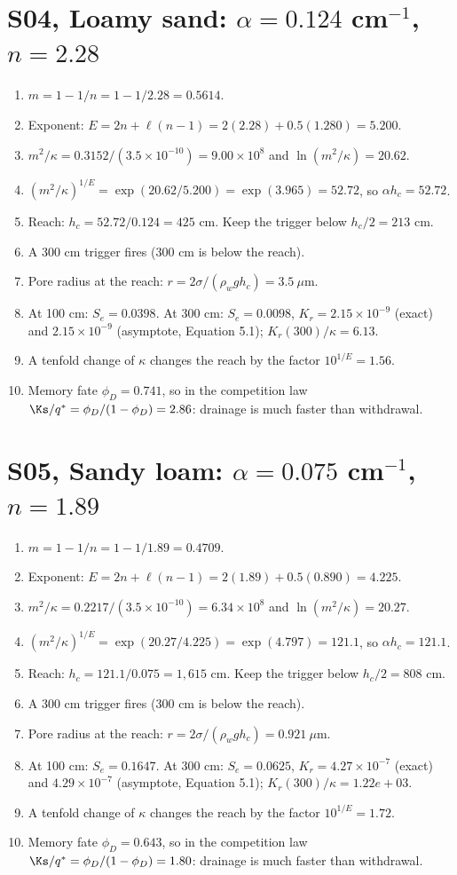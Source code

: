 \section{S04, Loamy sand: $\alpha=0.124$ cm$^{-1}$, $n=2.28$}
\begin{enumerate}[leftmargin=*,itemsep=1pt]
\item $m=1-1/n=1-1/2.28=0.5614$.
\item Exponent: $E=2n+\ell(n-1)=2(2.28)+0.5(1.280)=5.200$.
\item $m^2/\kappa=0.3152/(3.5\times10^{-10})=9.00\times10^{8}$ and $\ln(m^2/\kappa)=20.62$.
\item $(m^2/\kappa)^{1/E}=\exp(20.62/5.200)=\exp(3.965)=52.72$, so $\alpha h_c=52.72$.
\item Reach: $h_c=52.72/0.124=425$ cm. Keep the trigger below $h_c/2=213$ cm.
\item A 300 cm trigger fires (300 cm is below the reach).
\item Pore radius at the reach: $r=2\sigma/(\rho_wgh_c)=3.5\ \mu$m.
\item At 100 cm: $S_e=0.0398$. At 300 cm: $S_e=0.0098$, $K_r=2.15\times10^{-9}$ (exact) and $2.15\times10^{-9}$ (asymptote, Equation 5.1); $K_r(300)/\kappa=6.13$.
\item A tenfold change of $\kappa$ changes the reach by the factor $10^{1/E}=1.56$.
\item Memory fate $\phi_D=0.741$, so in the competition law $\Ks/q^*=\phi_D/(1-\phi_D)=2.86$: drainage is much faster than withdrawal.
\end{enumerate}
\section{S05, Sandy loam: $\alpha=0.075$ cm$^{-1}$, $n=1.89$}
\begin{enumerate}[leftmargin=*,itemsep=1pt]
\item $m=1-1/n=1-1/1.89=0.4709$.
\item Exponent: $E=2n+\ell(n-1)=2(1.89)+0.5(0.890)=4.225$.
\item $m^2/\kappa=0.2217/(3.5\times10^{-10})=6.34\times10^{8}$ and $\ln(m^2/\kappa)=20.27$.
\item $(m^2/\kappa)^{1/E}=\exp(20.27/4.225)=\exp(4.797)=121.1$, so $\alpha h_c=121.1$.
\item Reach: $h_c=121.1/0.075=1,615$ cm. Keep the trigger below $h_c/2=808$ cm.
\item A 300 cm trigger fires (300 cm is below the reach).
\item Pore radius at the reach: $r=2\sigma/(\rho_wgh_c)=0.921\ \mu$m.
\item At 100 cm: $S_e=0.1647$. At 300 cm: $S_e=0.0625$, $K_r=4.27\times10^{-7}$ (exact) and $4.29\times10^{-7}$ (asymptote, Equation 5.1); $K_r(300)/\kappa=1.22e+03$.
\item A tenfold change of $\kappa$ changes the reach by the factor $10^{1/E}=1.72$.
\item Memory fate $\phi_D=0.643$, so in the competition law $\Ks/q^*=\phi_D/(1-\phi_D)=1.80$: drainage is much faster than withdrawal.
\end{enumerate}
